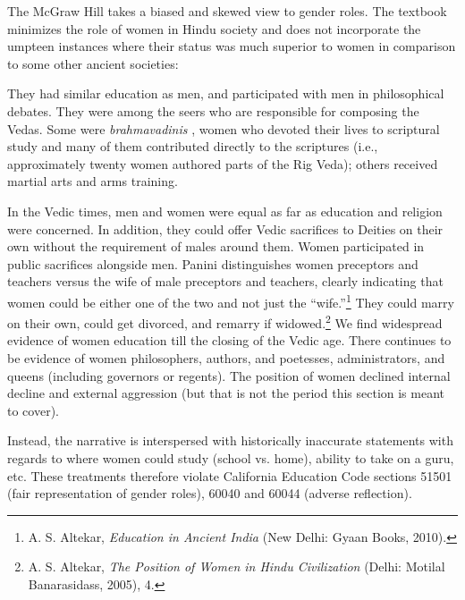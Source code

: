 The McGraw Hill takes a biased and skewed view to gender roles. The textbook minimizes the role of women in Hindu society and does not incorporate the umpteen instances where their status was much superior to women in comparison to some other ancient societies:  

They had similar education as men, and participated with men in philosophical debates. They were among the seers who are responsible for composing the Vedas. Some were \textit{brahmavadinis} , women who devoted their lives to scriptural study and many of them contributed directly to the scriptures (i.e., approximately twenty women authored parts of the Rig Veda); others received martial arts and arms training.

In the Vedic times, men and women were equal as far as education and religion were concerned. In addition, they could offer Vedic sacrifices to Deities on their own without the requirement of males around them. Women participated in public sacrifices alongside men. Panini distinguishes women preceptors and teachers versus the wife of male preceptors and teachers, clearly indicating that women could be either one of the two and not just the “wife.”\footnote{A. S. Altekar, \textit{Education in Ancient India} (New Delhi: Gyaan Books, 2010).} They could marry on their own, could get divorced, and remarry if widowed.\footnote{A. S. Altekar, \textit{The Position of Women in Hindu Civilization} (Delhi: Motilal Banarasidass, 2005), 4.} We find widespread evidence of women education till the closing of the Vedic age. There continues to be evidence of women philosophers, authors, and poetesses, administrators, and queens (including governors or regents). The position of women declined internal decline and external aggression (but that is not the period this section is meant to cover).  

Instead, the narrative is interspersed with historically inaccurate statements with regards to where women could study (school vs. home), ability to take on a guru, etc. These treatments therefore violate California Education Code sections 51501 (fair representation of gender roles), 60040 and 60044 (adverse reflection).  

